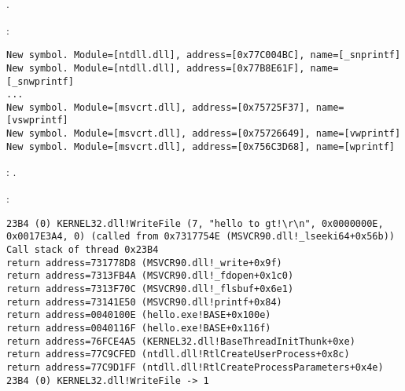  .

 :

\begin{lstlisting}
New symbol. Module=[ntdll.dll], address=[0x77C004BC], name=[_snprintf]
New symbol. Module=[ntdll.dll], address=[0x77B8E61F], name=[_snwprintf]
...
New symbol. Module=[msvcrt.dll], address=[0x75725F37], name=[vswprintf]
New symbol. Module=[msvcrt.dll], address=[0x75726649], name=[vwprintf]
New symbol. Module=[msvcrt.dll], address=[0x756C3D68], name=[wprintf]
\end{lstlisting}

: .

\forexample{}


:

\begin{lstlisting}
23B4 (0) KERNEL32.dll!WriteFile (7, "hello to gt!\r\n", 0x0000000E, 0x0017E3A4, 0) (called from 0x7317754E (MSVCR90.dll!_lseeki64+0x56b))
Call stack of thread 0x23B4
return address=731778D8 (MSVCR90.dll!_write+0x9f)
return address=7313FB4A (MSVCR90.dll!_fdopen+0x1c0)
return address=7313F70C (MSVCR90.dll!_flsbuf+0x6e1)
return address=73141E50 (MSVCR90.dll!printf+0x84)
return address=0040100E (hello.exe!BASE+0x100e)
return address=0040116F (hello.exe!BASE+0x116f)
return address=76FCE4A5 (KERNEL32.dll!BaseThreadInitThunk+0xe)
return address=77C9CFED (ntdll.dll!RtlCreateUserProcess+0x8c)
return address=77C9D1FF (ntdll.dll!RtlCreateProcessParameters+0x4e)
23B4 (0) KERNEL32.dll!WriteFile -> 1
\end{lstlisting}



